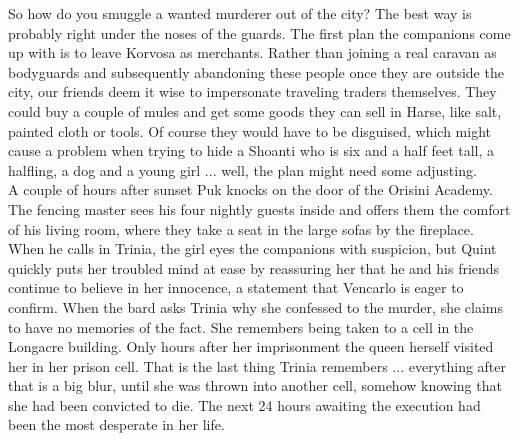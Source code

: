 So how do you smuggle a wanted murderer out of the city? The best way is probably right under the noses of the guards. The first plan the companions come up with is to leave Korvosa as merchants. Rather than joining a real caravan as bodyguards and subsequently abandoning these people once they are outside the city, our friends deem it wise to impersonate traveling traders themselves. They could buy a couple of mules and get some goods they can sell in Harse, like salt, painted cloth or tools. Of course they would have to be disguised, which might cause a problem when trying to hide a Shoanti who is six and a half feet tall, a halfling, a dog and a young girl ... well, the plan might need some adjusting.\\

A couple of hours after sunset Puk knocks on the door of the Orisini Academy. The fencing master sees his four nightly guests inside and offers them the comfort of his living room, where they take a seat in the large sofas by the fireplace. When he calls in Trinia, the girl eyes the companions with suspicion, but Quint quickly puts her troubled mind at ease by reassuring her that he and his friends continue to believe in her innocence, a statement that Vencarlo is eager to confirm. When the bard asks Trinia why she confessed to the murder, she claims to have no memories of the fact. She remembers being taken to a cell in the Longacre building. Only hours after her imprisonment the queen herself visited her in her prison cell. That is the last thing Trinia remembers ... everything after that is a big blur, until she was thrown into another cell, somehow knowing that she had been convicted to die. The next 24 hours awaiting the execution had been the most desperate in her life.\\

